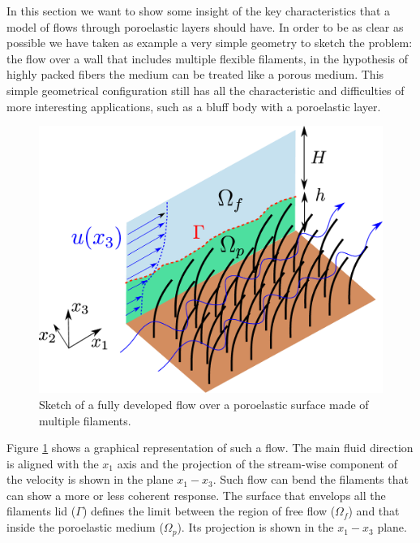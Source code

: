 In this section we want to show some insight of the key characteristics that a model of flows through poroelastic layers should have.
In order to be as clear as possible we have taken as example a very simple geometry to sketch the problem: the flow over a wall that includes multiple flexible filaments, in the hypothesis of highly packed fibers the medium can be treated like a porous medium. 
This simple geometrical configuration still has all the characteristic and difficulties of more interesting applications, such as a bluff body with a poroelastic layer.

\begin{figure}[h]
	\centering
	\includegraphics[width=0.7\linewidth]{chapter_1/problem_schema}
	\caption{Sketch of a fully developed flow over a poroelastic surface made of multiple filaments.}
	\label{fig:schema_problem}
\end{figure}

Figure \ref{fig:schema_problem} shows a graphical representation of such a flow. The main fluid direction is aligned with the $x_1$ axis and the projection of the stream-wise component of the velocity is shown in the plane $x_1 - x_3$.
Such flow can bend the filaments that can show a more or less coherent response.
The surface that envelops all the filaments lid ($\Gamma$) defines the limit between the region of free flow ($\Omega_{f}$) and that inside the poroelastic medium ($\Omega_{p}$). Its projection is shown in the  $x_1 - x_3$ plane.

